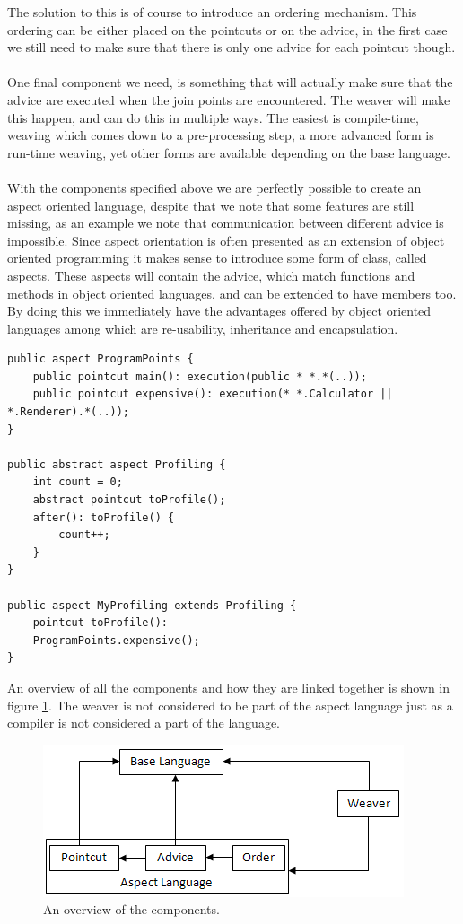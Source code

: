 \documentclass[a4paper]{report}
\begin{document}
The solution to this is of course to introduce an ordering mechanism. This ordering can be either placed on the pointcuts or on the advice, in the first case we still need to make sure that there is only one advice for each pointcut though.\\
\\
One final component we need, is something that will actually make sure that the advice are executed when the join points are encountered. The weaver will make this happen, and can do this in multiple ways. The easiest is compile-time, weaving which comes down to a pre-processing step, a more advanced form is run-time weaving, yet other forms are available depending on the base language.\\
\\
With the components specified above we are perfectly possible to create an aspect oriented language, despite that we note that some features are still missing, as an example we note that communication between different advice is impossible. Since aspect orientation is often presented as an extension of object oriented programming it makes sense to introduce some form of class, called aspects. These aspects will contain the advice, which match functions and methods in object oriented languages, and can be extended to have members too. By doing this we immediately have the advantages offered by object oriented languages among which are re-usability, inheritance and encapsulation.
\begin{lstlisting}[caption=Possibilities to reuse aspects.]
public aspect ProgramPoints {
	public pointcut main(): execution(public * *.*(..));
	public pointcut expensive(): execution(* *.Calculator || *.Renderer).*(..));
}

public abstract aspect Profiling {
	int count = 0;
	abstract pointcut toProfile();
	after(): toProfile() {
		count++;
	}
}

public aspect MyProfiling extends Profiling {
	pointcut toProfile():
	ProgramPoints.expensive();
}
\end{lstlisting}
An overview of all the components and how they are linked together is shown in figure \ref{fig:Aspect_Components}. The weaver is not considered to be part of the aspect language just as a compiler is not considered a part of the language.
\begin{figure}
\includegraphics[scale=1]{images/AOF/Components.png}
\caption{An overview of the components.}
\label{fig:Aspect_Components}
\end{figure}
\end{document}
